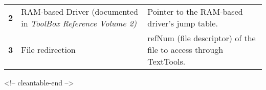 \documentclass{report}
\begin{document}
\begin{tabular}{rll}
\begin{minipage}[b]{1cm}
	\sloppy 
	\bf 2 \rm
\end{minipage} \hfill &
\begin{minipage}[t]{5cm}
	\sloppy
	RAM-based Driver (documented in \it ToolBox Reference Volume 2\rm)
\end{minipage} \hfill &
\begin{minipage}[t]{5cm}
	\sloppy
	Pointer to the RAM-based driver's jump table.
\end{minipage} \hfill \\


\begin{minipage}[b]{1cm}
	\sloppy 
	\bf 3 \rm
\end{minipage} \hfill &
\begin{minipage}[t]{5cm}
	File redirection
\end{minipage} \hfill &
\begin{minipage}[t]{5cm}
	refNum (file descriptor) of the file to access through TextTools.
\end{minipage} \hfill \\
\end{tabular}
\begin{rawhtml}
<!-- cleantable-end -->
\end{rawhtml}
\end{document}
